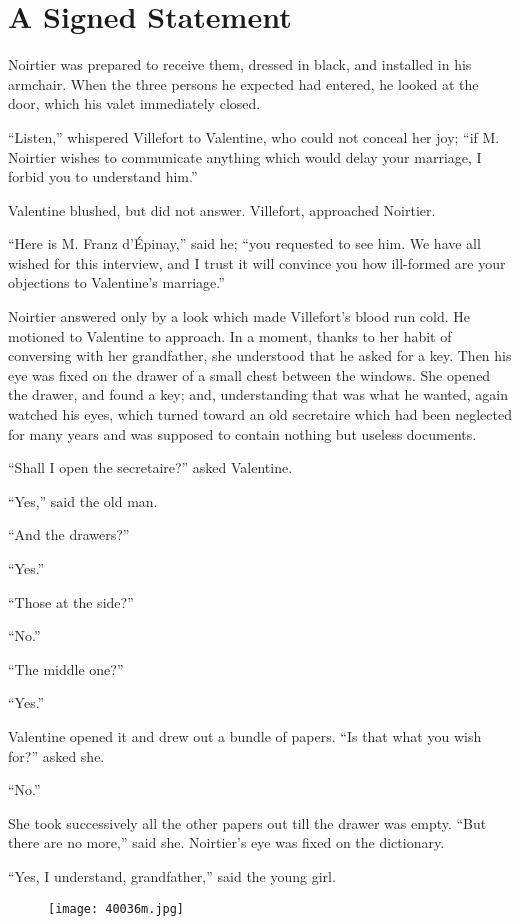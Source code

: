 \chapter{A Signed Statement}

Noirtier was prepared to receive them, dressed in black, and installed
in his armchair. When the three persons he expected had entered, he
looked at the door, which his valet immediately closed.

“Listen,” whispered Villefort to Valentine, who could not conceal her
joy; “if M. Noirtier wishes to communicate anything which would delay
your marriage, I forbid you to understand him.”

Valentine blushed, but did not answer. Villefort, approached Noirtier.

“Here is M. Franz d’Épinay,” said he; “you requested to see him. We
have all wished for this interview, and I trust it will convince you
how ill-formed are your objections to Valentine’s marriage.”

Noirtier answered only by a look which made Villefort’s blood run cold.
He motioned to Valentine to approach. In a moment, thanks to her habit
of conversing with her grandfather, she understood that he asked for a
key. Then his eye was fixed on the drawer of a small chest between the
windows. She opened the drawer, and found a key; and, understanding
that was what he wanted, again watched his eyes, which turned toward an
old secretaire which had been neglected for many years and was supposed
to contain nothing but useless documents.

“Shall I open the secretaire?” asked Valentine.

“Yes,” said the old man.

“And the drawers?”

“Yes.”

“Those at the side?”

“No.”

“The middle one?”

“Yes.”

Valentine opened it and drew out a bundle of papers. “Is that what you
wish for?” asked she.

“No.”

She took successively all the other papers out till the drawer was
empty. “But there are no more,” said she. Noirtier’s eye was fixed on
the dictionary.

“Yes, I understand, grandfather,” said the young girl.

\begin{figure}[ht]
\texttt{[image: 40036m.jpg]}
\end{figure}

